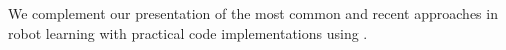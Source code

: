 We complement our presentation of the most common and recent approaches in robot learning with practical code implementations using \lerobot.


